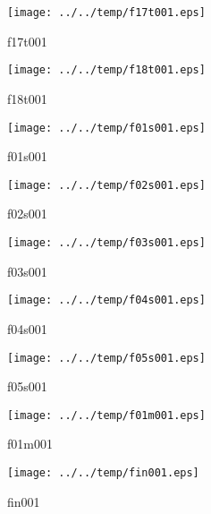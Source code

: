 \documentclass[a4paper,twoside,11pt]{article}
\makeatletter
\def\maxwidth{%
  \ifdim\Gin@nat@width>\linewidth
    \linewidth
  \else
    \Gin@nat@width
  \fi
}
\makeatother
\begin{document}
\clearpage
\begin{figure}
  \centering
  \texttt{[image: ../../temp/f17t001.eps]}
  \caption{f17t001}
  \label{fig:f17t001}
\end{figure}

\begin{figure}
  \centering
  \texttt{[image: ../../temp/f18t001.eps]}
  \caption{f18t001}
  \label{fig:f18t001}
\end{figure}

\clearpage
\begin{figure}
  \centering
  \texttt{[image: ../../temp/f01s001.eps]}
  \caption{f01s001}
  \label{fig:f01s001}
\end{figure}

\begin{figure}
  \centering
  \texttt{[image: ../../temp/f02s001.eps]}
  \caption{f02s001}
  \label{fig:f02s001}
\end{figure}

\clearpage
\begin{figure}
  \centering
  \texttt{[image: ../../temp/f03s001.eps]}
  \caption{f03s001}
  \label{fig:f03s001}
\end{figure}

\begin{figure}
  \centering
  \texttt{[image: ../../temp/f04s001.eps]}
  \caption{f04s001}
  \label{fig:f04s001}
\end{figure}

\clearpage
\begin{figure}
  \centering
  \texttt{[image: ../../temp/f05s001.eps]}
  \caption{f05s001}
  \label{fig:f05s001}
\end{figure}

\begin{figure}
  \centering
  \texttt{[image: ../../temp/f01m001.eps]}
  \caption{f01m001}
  \label{fig:f01m001}
\end{figure}

\clearpage
\begin{figure}
  \centering
  \texttt{[image: ../../temp/fin001.eps]}
  \caption{fin001}
  \label{fig:fin001}
\end{figure}
\end{document}
